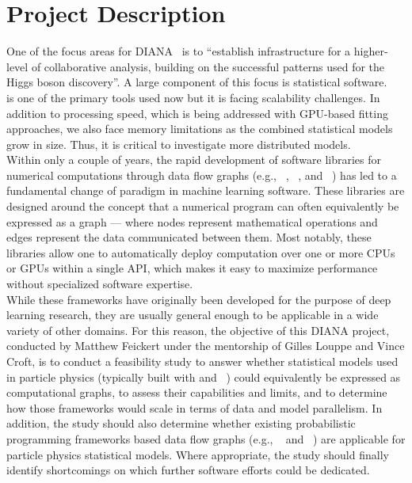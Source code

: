 \section{Project Description}

One of the focus areas for DIANA~\cite{DIANA-proposal-2014} is to ``establish infrastructure for a higher-level of collaborative analysis, building on the successful patterns used for the Higgs boson discovery''.
A large component of this focus is statistical software.
~\cite{Verkerke:2003ir} is one of the primary tools used now but it is facing scalability challenges.
In addition to processing speed, which is being addressed with GPU-based fitting approaches, we also face memory limitations as the combined statistical models grow in size.
Thus, it is critical to investigate more distributed models.\\

Within only a couple of years, the rapid development of software libraries for numerical computations through data flow graphs (e.g., ~\cite{tensorflow2015-whitepaper}, ~\cite{theano-full}, and ~\cite{DBLP:journals/corr/ChenLLLWWXXZZ15}) has led to a fundamental change of paradigm in machine learning software.
These libraries are designed around the concept that a numerical program can often equivalently be expressed as a graph --- where nodes represent mathematical operations and edges represent the data communicated between them.
Most notably, these libraries allow one to automatically deploy computation over one or more CPUs or GPUs within a single API, which makes it easy to maximize performance without specialized software expertise.\\

While these frameworks have originally been developed for the purpose of deep learning research, they are usually general enough to be applicable in a wide variety of other domains.
For this reason, the objective of this DIANA project, conducted by Matthew Feickert under the mentorship of Gilles Louppe and Vince Croft, is to conduct a feasibility study to answer whether statistical models used in particle physics (typically built with  and ~\cite{Cranmer:2012sba}) could equivalently be expressed as computational graphs, to assess their capabilities and limits, and to determine how those frameworks would scale in terms of data and model parallelism.
In addition, the study should also determine whether existing probabilistic programming frameworks based data flow graphs (e.g., ~\cite{tran2016edward} and ~\cite{tensorprob2016}) are applicable for particle physics statistical models.
Where appropriate, the study should finally identify shortcomings on which further software efforts could be dedicated.\\

